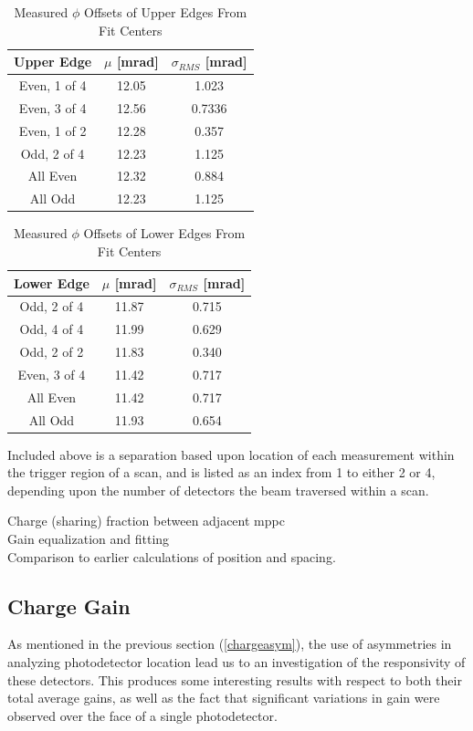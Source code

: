 \begin{table}[H]
    \centering
    \begin{tabular}{c||c|c}
        \bf Upper Edge & \bf \boldmath$\mu$ [mrad] & \bf \boldmath$\sigma_{RMS}$ [mrad] \\
         \hline
        Even, 1 of 4 & 12.05 & 1.023 \\
        Even, 3 of 4 & 12.56 & 0.7336 \\
        Even, 1 of 2 & 12.28 & 0.357  \\
        Odd, 2 of 4 & 12.23 & 1.125  \\
        \hline
        All Even & 12.32 & 0.884 \\
        All Odd & 12.23 & 1.125
    \end{tabular}
    \caption{Measured $\phi$ Offsets of Upper Edges From Fit Centers}
    \label{tab:upperedgeasymphi}
\end{table}
\begin{table}[H]
    \centering
    \begin{tabular}{c||c|c}
         \bf Lower Edge & \bf \boldmath$\mu$ [mrad] & \bf \boldmath$\sigma_{RMS}$ [mrad]\\
         \hline
         Odd, 2 of 4 & 11.87 & 0.715 \\
         Odd, 4 of 4 & 11.99 & 0.629 \\
         Odd, 2 of 2 & 11.83 & 0.340 \\
         Even, 3 of 4 & 11.42 & 0.717 \\
         \hline
         All Even & 11.42 & 0.717 \\
         All Odd & 11.93 & 0.654
    \end{tabular}
    \caption{Measured $\phi$ Offsets of Lower Edges From Fit Centers}
    \label{tab:loweredgeasymphi}
\end{table}
Included above is a separation based upon location of each measurement within the trigger region of a scan, and is listed as an index from 1 to either 2 or 4, depending upon the number of detectors the beam traversed within a scan.


Charge (sharing) fraction between adjacent mppc \\
Gain equalization and fitting  \\
Comparison to earlier calculations of position and spacing. \\


\subsection{Charge Gain} \label{Qgain}
As mentioned in the previous section (\ref{chargeasym}), the use of asymmetries in analyzing photodetector location lead us to an investigation of the responsivity of these detectors. This produces some interesting results with respect to both their total average gains, as well as the fact that significant variations in gain were observed over the face of a single photodetector.

